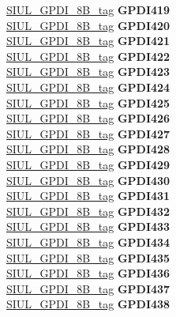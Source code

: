 \begin{DoxyCompactItemize}
\begin{tabbing}
\>\>\mbox{\hyperlink{unionSIUL__GPDI__8B__tag}{SIUL\_GPDI\_8B\_tag}} {\bfseries GPDI419}\\
\>\>\mbox{\hyperlink{unionSIUL__GPDI__8B__tag}{SIUL\_GPDI\_8B\_tag}} {\bfseries GPDI420}\\
\>\>\mbox{\hyperlink{unionSIUL__GPDI__8B__tag}{SIUL\_GPDI\_8B\_tag}} {\bfseries GPDI421}\\
\>\>\mbox{\hyperlink{unionSIUL__GPDI__8B__tag}{SIUL\_GPDI\_8B\_tag}} {\bfseries GPDI422}\\
\>\>\mbox{\hyperlink{unionSIUL__GPDI__8B__tag}{SIUL\_GPDI\_8B\_tag}} {\bfseries GPDI423}\\
\>\>\mbox{\hyperlink{unionSIUL__GPDI__8B__tag}{SIUL\_GPDI\_8B\_tag}} {\bfseries GPDI424}\\
\>\>\mbox{\hyperlink{unionSIUL__GPDI__8B__tag}{SIUL\_GPDI\_8B\_tag}} {\bfseries GPDI425}\\
\>\>\mbox{\hyperlink{unionSIUL__GPDI__8B__tag}{SIUL\_GPDI\_8B\_tag}} {\bfseries GPDI426}\\
\>\>\mbox{\hyperlink{unionSIUL__GPDI__8B__tag}{SIUL\_GPDI\_8B\_tag}} {\bfseries GPDI427}\\
\>\>\mbox{\hyperlink{unionSIUL__GPDI__8B__tag}{SIUL\_GPDI\_8B\_tag}} {\bfseries GPDI428}\\
\>\>\mbox{\hyperlink{unionSIUL__GPDI__8B__tag}{SIUL\_GPDI\_8B\_tag}} {\bfseries GPDI429}\\
\>\>\mbox{\hyperlink{unionSIUL__GPDI__8B__tag}{SIUL\_GPDI\_8B\_tag}} {\bfseries GPDI430}\\
\>\>\mbox{\hyperlink{unionSIUL__GPDI__8B__tag}{SIUL\_GPDI\_8B\_tag}} {\bfseries GPDI431}\\
\>\>\mbox{\hyperlink{unionSIUL__GPDI__8B__tag}{SIUL\_GPDI\_8B\_tag}} {\bfseries GPDI432}\\
\>\>\mbox{\hyperlink{unionSIUL__GPDI__8B__tag}{SIUL\_GPDI\_8B\_tag}} {\bfseries GPDI433}\\
\>\>\mbox{\hyperlink{unionSIUL__GPDI__8B__tag}{SIUL\_GPDI\_8B\_tag}} {\bfseries GPDI434}\\
\>\>\mbox{\hyperlink{unionSIUL__GPDI__8B__tag}{SIUL\_GPDI\_8B\_tag}} {\bfseries GPDI435}\\
\>\>\mbox{\hyperlink{unionSIUL__GPDI__8B__tag}{SIUL\_GPDI\_8B\_tag}} {\bfseries GPDI436}\\
\>\>\mbox{\hyperlink{unionSIUL__GPDI__8B__tag}{SIUL\_GPDI\_8B\_tag}} {\bfseries GPDI437}\\
\>\>\mbox{\hyperlink{unionSIUL__GPDI__8B__tag}{SIUL\_GPDI\_8B\_tag}} {\bfseries GPDI438}\\

\end{tabbing}
\end{DoxyCompactItemize}
